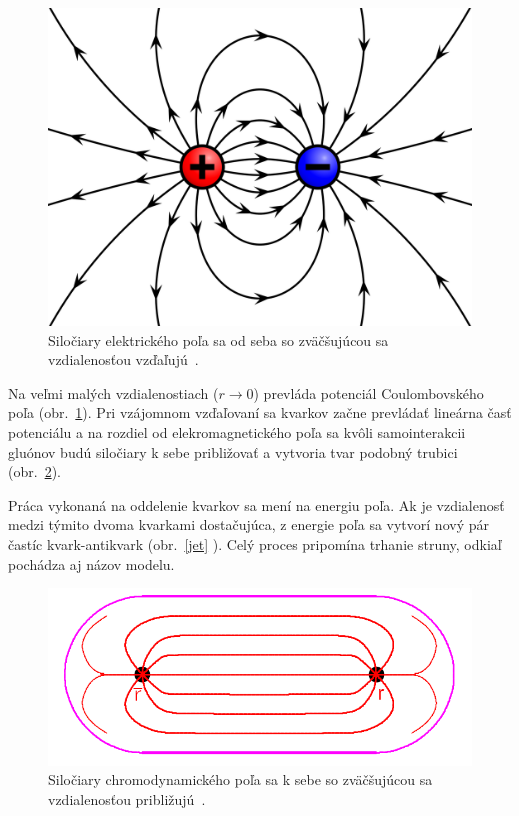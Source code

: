 \documentclass[thesismargins, thesislinespacing]{rnthesis}
\begin{document}
\begin{figure}[hbtp!]
	\centering
	\includegraphics[scale=0.15]{./Obrazky_praca/el_pole.png}
	\caption{Siločiary elektrického poľa sa od seba so zväčšujúcou sa vzdialenosťou vzďaľujú~\cite{6}.}
	\label{elpole}
\end{figure}  

Na veľmi malých vzdialenostiach ($r\rightarrow0$) prevláda potenciál Coulombovského poľa (obr.~\ref{elpole}). Pri vzájomnom vzďaľovaní sa kvarkov začne prevládať lineárna časť potenciálu a na rozdiel od elekromagnetického poľa sa kvôli samointerakcii gluónov budú siločiary k sebe približovať a vytvoria tvar podobný trubici (obr.~\ref{chrompole}).

Práca vykonaná na oddelenie kvarkov sa mení na energiu poľa. Ak je vzdialenosť medzi týmito dvoma kvarkami dostačujúca, z energie poľa sa vytvorí nový pár častíc kvark-antikvark (obr.~\ref{jet} ). Celý proces pripomína trhanie struny, odkiaľ pochádza aj názov modelu.

\begin{figure}[hbtp!]
	\centering
	\includegraphics[scale=0.4]{./Obrazky_praca/chromo_pole.png}
	\caption {Siločiary chromodynamického poľa sa k sebe so zväčšujúcou sa vzdialenosťou približujú~\cite{7}.}
	\label{chrompole}
\end{figure}
\end{document}
